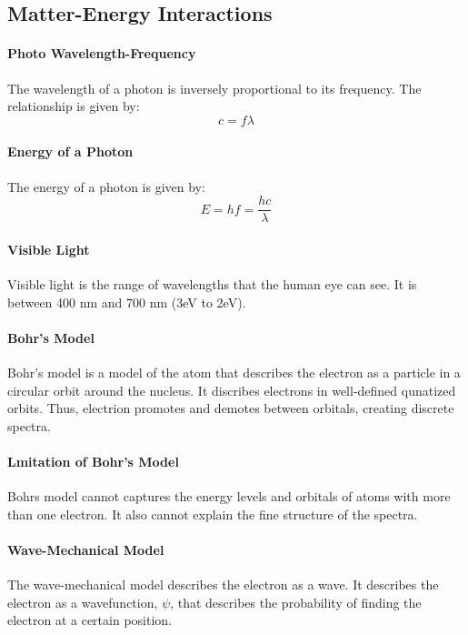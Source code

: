 \documentclass[11pt]{article}
\begin{document}
\subsection{Matter-Energy Interactions}
\paragraph{Photo Wavelength-Frequency} The wavelength of a photon is inversely proportional to its frequency. The relationship is given by:
\begin{equation}
    c = f\lambda
\end{equation}
\paragraph{Energy of a Photon} The energy of a photon is given by:
\begin{equation}
    E = hf = \frac{hc}{\lambda}
\end{equation}
\paragraph{Visible Light} Visible light is the range of wavelengths that the human eye can see. It is between 400 nm and 700 nm (3eV to 2eV).
\paragraph{Bohr's Model} Bohr's model is a model of the atom that describes the electron as a particle in a circular orbit around the nucleus. It discribes electrons in well-defined qunatized orbits. Thus, electrion promotes and demotes between orbitals, creating discrete spectra.
\paragraph{Lmitation of Bohr's Model} Bohrs model cannot captures the energy levels and orbitals of atoms with more than one electron. It also cannot explain the fine structure of the spectra.
\paragraph{Wave-Mechanical Model} The wave-mechanical model describes the electron as a wave. It describes the electron as a wavefunction, $\psi$, that describes the probability of finding the electron at a certain position. 
\end{document}
